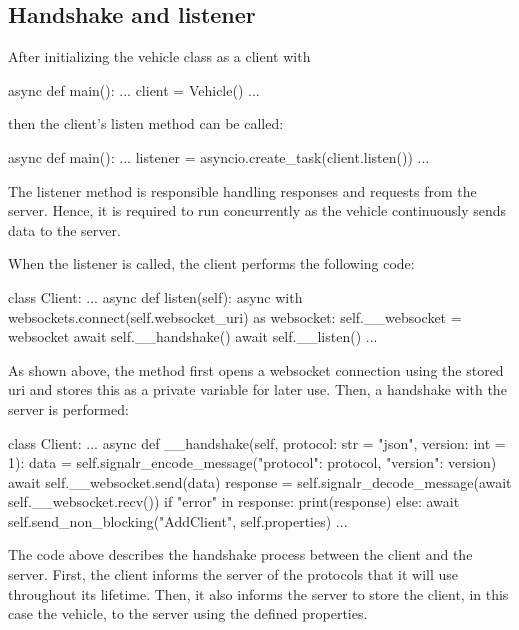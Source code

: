 \subsection{Handshake and listener}\label{handshake}
After initializing the vehicle class as a client with
\begin{python}
async def main():
	...
	client = Vehicle()
	...
\end{python}
then the client's listen method can be called:
\begin{python}
async def main():
	...
	listener = asyncio.create_task(client.listen())
	...
\end{python}
The listener method is responsible handling responses and requests from the server. Hence, it is required to run concurrently as the vehicle continuously sends data to the server.

When the listener is called, the client performs the following code:
\begin{python}
class Client:
	...
	async def listen(self):
		async with websockets.connect(self.websocket_uri) as websocket:
			self.__websocket = websocket
			await self.__handshake()
			await self.__listen()
	...
\end{python}
As shown above, the method first opens a websocket connection using the stored uri and stores this as a private variable for later use. Then, a handshake with the server is performed:
\begin{python}
class Client:
	...
	async def __handshake(self, protocol: str = "json", version: int = 1):
		data = self.signalr_encode_message({"protocol": protocol, "version": version})
		await self.__websocket.send(data)
		response = self.signalr_decode_message(await self.__websocket.recv())
		if "error" in response:
			print(response)
		else:
			await self.send_non_blocking("AddClient", self.properties)
	...
\end{python}

The code above describes the handshake process between the client and the server. First, the client informs the server of the protocols that it will use throughout its lifetime. Then, it also informs the server to store the client, in this case the vehicle, to the server using the defined properties.

